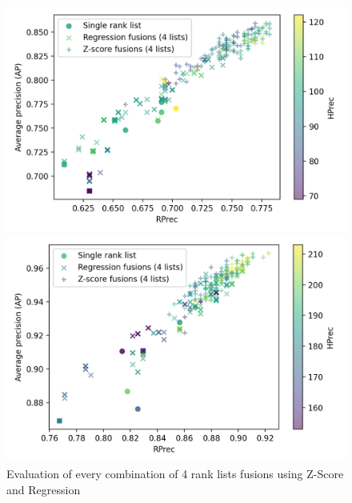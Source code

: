 \begin{figure}
  \centering
  \caption{Evaluation of every combination of 4 rank lists fusions using Z-Score and Regression}
  \label{fig:fusions}

  \label{fig:fusion_evaluation_A}
  \includegraphics[width=\linewidth]{img/fusion_evaluation_A.png}

  \vspace{0.5cm}

  \label{fig:fusion_evaluation_B}
  \includegraphics[width=\linewidth]{img/fusion_evaluation_B.png}
\end{figure}

